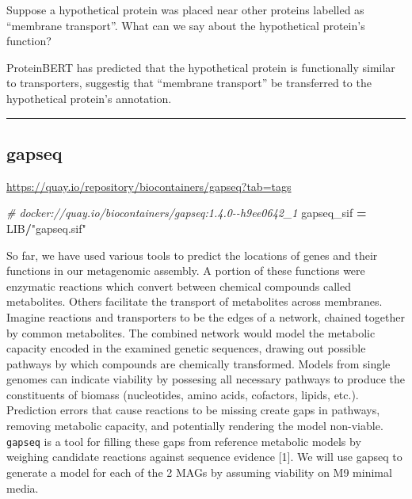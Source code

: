 \documentclass[
]{book}
\newenvironment{Shaded}{\begin{snugshade}}{\end{snugshade}}
\newcommand{\CommentTok}[1]{\textcolor[rgb]{0.56,0.35,0.01}{\textit{#1}}}
\newcommand{\NormalTok}[1]{#1}
\newcommand{\OperatorTok}[1]{\textcolor[rgb]{0.81,0.36,0.00}{\textbf{#1}}}
\newcommand{\StringTok}[1]{\textcolor[rgb]{0.31,0.60,0.02}{#1}}
\begin{document}
Suppose a hypothetical protein was placed near other proteins labelled as ``membrane transport''.
What can we say about the hypothetical protein's function?

ProteinBERT has predicted that the hypothetical protein is functionally similar to transporters, suggestig that ``membrane transport''
be transferred to the hypothetical protein's annotation.

\begin{center}\rule{0.5\linewidth}{0.5pt}\end{center}

\subsection{gapseq}\label{gapseq}

\url{https://quay.io/repository/biocontainers/gapseq?tab=tags}

\begin{Shaded}
\begin{Highlighting}[numbers=left,,]
\CommentTok{\# docker://quay.io/biocontainers/gapseq:1.4.0{-}{-}h9ee0642\_1}
\NormalTok{gapseq\_sif }\OperatorTok{=}\NormalTok{ LIB}\OperatorTok{/}\StringTok{"gapseq.sif"}
\end{Highlighting}
\end{Shaded}

So far, we have used various tools to predict the locations of genes and their functions in our metagenomic assembly.
A portion of these functions were enzymatic reactions which convert between chemical compounds called metabolites.
Others facilitate the transport of metabolites across membranes. Imagine reactions and transporters to be the edges of a network,
chained together by common metabolites. The combined network would model the metabolic capacity encoded in the examined genetic sequences,
drawing out possible pathways by which compounds are chemically transformed. Models from single genomes can indicate viability
by possesing all necessary pathways to produce the constituents of biomass (nucleotides, amino acids, cofactors, lipids, etc.).
Prediction errors that cause reactions to be missing create gaps in pathways, removing metabolic capacity, and potentially rendering
the model non-viable. \texttt{gapseq} is a tool for filling these gaps from reference metabolic models by weighing candidate reactions
against sequence evidence {[}1{]}. We will use gapseq to generate a model for each of the 2 MAGs by assuming viability on M9 minimal media.
\end{document}
